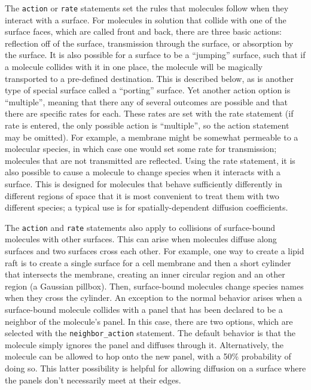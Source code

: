 \documentclass {book}
\newcommand {\ttt} {\texttt}
\begin{document}
The \ttt{action} or \ttt{rate} statements set the rules that molecules follow when they interact with a surface. For molecules in solution that collide with one of the surface faces, which are called front and back, there are three basic actions: reflection off of the surface, transmission through the surface, or absorption by the surface. It is also possible for a surface to be a ``jumping'' surface, such that if a molecule collides with it in one place, the molecule will be magically transported to a pre-defined destination. This is described below, as is another type of special surface called a ``porting'' surface. Yet another action option is ``multiple'', meaning that there any of several outcomes are possible and that there are specific rates for each. These rates are set with the rate statement (if rate is entered, the only possible action is ``multiple'', so the action statement may be omitted). For example, a membrane might be somewhat permeable to a molecular species, in which case one would set some rate for transmission; molecules that are not transmitted are reflected. Using the rate statement, it is also possible to cause a molecule to change species when it interacts with a surface. This is designed for molecules that behave sufficiently differently in different regions of space that it is most convenient to treat them with two different species; a typical use is for spatially-dependent diffusion coefficients.

The \ttt{action} and \ttt{rate} statements also apply to collisions of surface-bound molecules with other surfaces. This can arise when molecules diffuse along surfaces and two surfaces cross each other. For example, one way to create a lipid raft is to create a single surface for a cell membrane and then a short cylinder that intersects the membrane, creating an inner circular region and an other region (a Gaussian pillbox). Then, surface-bound molecules change species names when they cross the cylinder. An exception to the normal behavior arises when a surface-bound molecule collides with a panel that has been declared to be a neighbor of the molecule's panel. In this case, there are two options, which are selected with the \ttt{neighbor\_action} statement. The default behavior is that the molecule simply ignores the panel and diffuses through it. Alternatively, the molecule can be allowed to hop onto the new panel, with a 50\% probability of doing so. This latter possibility is helpful for allowing diffusion on a surface where the panels don't necessarily meet at their edges.
\end{document}
